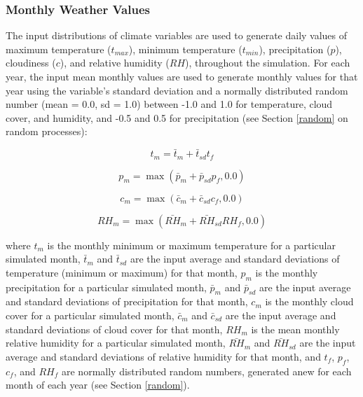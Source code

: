\documentclass[a4paper, 12pt] {report}
\begin{document}
\subsubsection{Monthly Weather Values}

The input distributions of climate variables are used to generate daily values of maximum temperature ($t_{max}$), minimum temperature ($t_{min}$), precipitation ($p$), cloudiness ($c$), and relative humidity ($RH$), throughout the simulation. For each year, the input mean monthly values are used to generate monthly values for that year using the variable's standard deviation and a normally distributed random number (mean = 0.0, sd = 1.0) between -1.0 and 1.0 for temperature, cloud cover, and humidity, and -0.5 and 0.5 for precipitation (see Section \ref{random} on random processes):

\begin{equation}
t_m = \bar{t}_m + \bar{t}_{sd} t_f
\end{equation}

\begin{equation}
p_m = \max{(\bar{p}_m + \bar{p}_{sd} p_f, 0.0)}
\end{equation}

\begin{equation}
c_m = \max{(\bar{c}_m + \bar{c}_{sd} c_f, 0.0)}
\end{equation}

\begin{equation}
RH_m = \max{(\bar{RH}_m + \bar{RH}_{sd} RH_f, 0.0)}
\end{equation}

where $t_m$ is the monthly minimum or maximum temperature for a particular simulated month, $\bar{t}_m$ and $\bar{t}_{sd}$ are the input average and standard deviations of temperature (minimum or maximum) for that month, $p_m$ is the monthly precipitation for a particular simulated month, $\bar{p}_m$ and $\bar{p}_{sd}$ are the input average and standard deviations of precipitation for that month, $c_m$ is the monthly cloud cover for a particular simulated month, $\bar{c}_m$ and $\bar{c}_{sd}$ are the input average and standard deviations of cloud cover for that month, $RH_m$ is the mean monthly relative humidity for a particular simulated month, $\bar{RH}_m$ and $\bar{RH}_{sd}$ are the input average and standard deviations of relative humidity for that month, and $t_f$, $p_f$, $c_f$, and $RH_f$ are normally distributed random numbers, generated anew for each month of each year (see Section \ref{random}).
\end{document}
